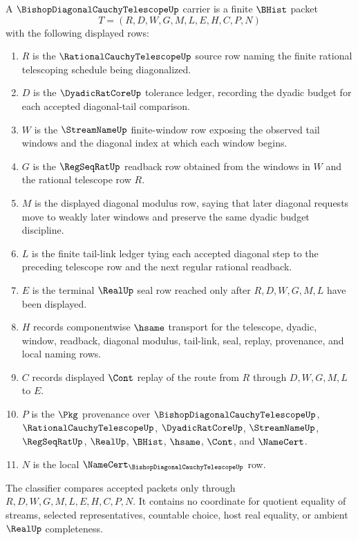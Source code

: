 \begin{definition}
\label{def:bishop-diagonal-cauchy-telescope-carrier}
A $\BishopDiagonalCauchyTelescopeUp$ carrier is a finite $\BHist$ packet
$$
T=(R,D,W,G,M,L,E,H,C,P,N)
$$
with the following displayed rows:
\begin{enumerate}
\item $R$ is the $\RationalCauchyTelescopeUp$ source row naming the finite rational telescoping schedule being diagonalized.
\item $D$ is the $\DyadicRatCoreUp$ tolerance ledger, recording the dyadic budget for each accepted diagonal-tail comparison.
\item $W$ is the $\StreamNameUp$ finite-window row exposing the observed tail windows and the diagonal index at which each window begins.
\item $G$ is the $\RegSeqRatUp$ readback row obtained from the windows in $W$ and the rational telescope row $R$.
\item $M$ is the displayed diagonal modulus row, saying that later diagonal requests move to weakly later windows and preserve the same dyadic budget discipline.
\item $L$ is the finite tail-link ledger tying each accepted diagonal step to the preceding telescope row and the next regular rational readback.
\item $E$ is the terminal $\RealUp$ seal row reached only after $R,D,W,G,M,L$ have been displayed.
\item $H$ records componentwise $\hsame$ transport for the telescope, dyadic, window, readback, diagonal modulus, tail-link, seal, replay, provenance, and local naming rows.
\item $C$ records displayed $\Cont$ replay of the route from $R$ through $D,W,G,M,L$ to $E$.
\item $P$ is the $\Pkg$ provenance over $\BishopDiagonalCauchyTelescopeUp$, $\RationalCauchyTelescopeUp$, $\DyadicRatCoreUp$, $\StreamNameUp$, $\RegSeqRatUp$, $\RealUp$, $\BHist$, $\hsame$, $\Cont$, and $\NameCert$.
\item $N$ is the local $\NameCert_{\BishopDiagonalCauchyTelescopeUp}$ row.
\end{enumerate}
The classifier compares accepted packets only through $R,D,W,G,M,L,E,H,C,P,N$. It contains no coordinate for quotient equality of streams, selected representatives, countable choice, host real equality, or ambient $\RealUp$ completeness.
\end{definition}

